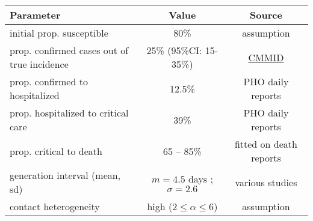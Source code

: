 \renewcommand{\arraystretch}{1.5}
\begin{table}[h!]
\begin{center}
\begin{tabular}{l c c}
\hline
\bf Parameter & \bf Value & \bf Source \\
\hline
initial prop. susceptible  & 80\% & assumption \\
prop. confirmed cases out of true incidence & 25\% (95\%CI: 15-35\%) & \href{https://cmmid.github.io/topics/covid19/severity/global_cfr_estimates.html}{CMMID} \\
prop. confirmed to hospitalized & 12.5\% & PHO daily reports \\
prop. hospitalized to critical care & 39\% & PHO daily reports \\
prop. critical to death & 65 -- 85\% & fitted on death reports \\
generation interval  (mean, sd) & $m=4.5$ days ; $\sigma=2.6$ & various studies \\
contact heterogeneity & high ($2\leq\alpha\leq 6$) & assumption\\
\hline
\end{tabular}
\end{center}
\end{table}%
